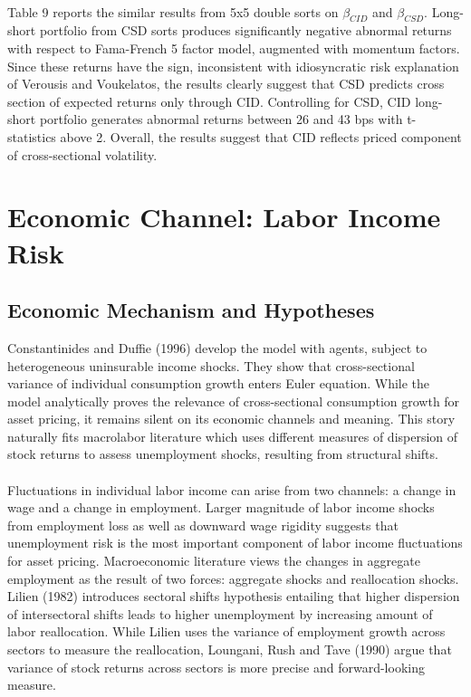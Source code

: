\documentclass[12pt]{article}
\begin{document}
\paragraph{}
Table 9 reports the similar results from 5x5 double sorts on $\beta_{CID}$ and $\beta_{CSD}$. Long-short portfolio from CSD sorts produces significantly negative abnormal returns with respect to Fama-French 5 factor model, augmented with momentum factors. Since these returns have the sign, inconsistent with idiosyncratic risk explanation of Verousis and Voukelatos, the results clearly suggest that CSD predicts cross section of expected returns only through CID. Controlling for CSD, CID long-short portfolio generates abnormal returns between 26 and 43 bps with t-statistics above 2. Overall, the results suggest that CID reflects priced component of cross-sectional volatility.

\section{Economic Channel: Labor Income Risk} \label{sec:Model}

\subsection{Economic Mechanism and Hypotheses}

Constantinides and Duffie (1996) develop the model with agents, subject to heterogeneous uninsurable income shocks. They show that cross-sectional variance of individual consumption growth enters Euler equation. While the model analytically proves the relevance of cross-sectional consumption growth for asset pricing, it remains silent on its economic channels and meaning. This story naturally fits macrolabor literature which uses different measures of dispersion of stock returns to assess unemployment shocks, resulting from structural shifts.
\paragraph{}
Fluctuations in individual labor income can arise from two channels: a change in wage and a change in employment. Larger magnitude of labor income shocks from employment loss as well as downward wage rigidity suggests that unemployment risk is the most important component of labor income fluctuations for asset pricing. Macroeconomic literature views the changes in aggregate employment as the result of two forces: aggregate shocks and reallocation shocks. Lilien (1982) introduces sectoral shifts hypothesis entailing that higher dispersion of intersectoral shifts leads to higher unemployment by increasing amount of labor reallocation. While Lilien uses the variance of employment growth across sectors to measure the reallocation, Loungani, Rush and Tave (1990) argue that variance of stock returns across sectors is more precise and forward-looking measure. 
\end{document}
